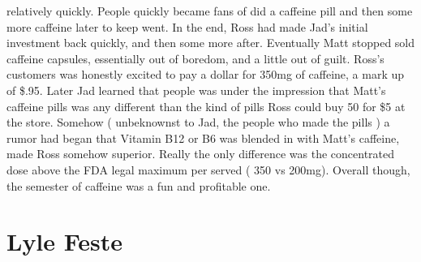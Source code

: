 \documentclass[12pt]{book}
\begin{document}
relatively quickly. People quickly became fans of did a caffeine pill and then some more caffeine later to keep went. In the end, Ross had made Jad's initial investment back quickly, and then some more after. Eventually Matt stopped sold caffeine capsules, essentially out of boredom, and a little out of guilt. Ross's customers was honestly excited to pay a dollar for 350mg of caffeine, a mark up of \$.95. Later Jad learned that people was under the impression that Matt's caffeine pills was any different than the kind of pills Ross could buy 50 for \$5 at the store. Somehow ( unbeknownst to Jad, the people who made the pills ) a rumor had began that Vitamin B12 or B6 was blended in with Matt's caffeine, made Ross somehow superior. Really the only difference was the concentrated dose above the FDA legal maximum per served ( 350 vs 200mg). Overall though, the semester of caffeine was a fun and profitable one.



\chapter{Lyle Feste}
\end{document}
